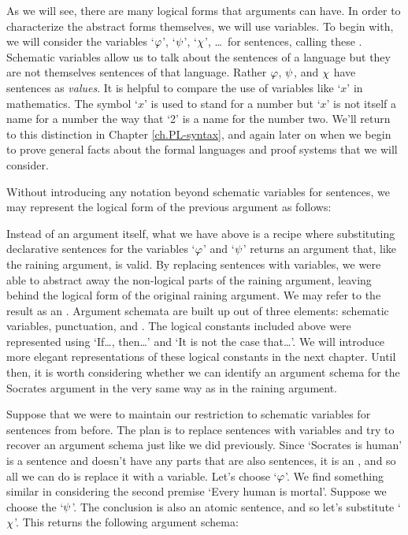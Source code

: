 As we will see, there are many logical forms that arguments can have.
In order to characterize the abstract forms themselves, we will use variables.
To begin with, we will consider the variables `$\varphi$', `$\psi$', `$\chi$', \ldots\ for sentences, calling these .
Schematic variables allow us to talk about the sentences of a language but they are not themselves sentences of that language.
Rather $\varphi$, $\psi$, and $\chi$ have sentences as \textit{values}.
It is helpful to compare the use of variables like `$x$' in mathematics.
The symbol `$x$' is used to stand for a number but `$x$' is not itself a name for a number the way that `2' is a name for the number two.
We'll return to this distinction in Chapter \ref{ch.PL-syntax}, and again later on when we begin to prove general facts about the formal languages and proof systems that we will consider.

Without introducing any notation beyond schematic variables for sentences, we may represent the logical form of the previous argument as follows:

\begin{earg}
\end{earg}

Instead of an argument itself, what we have above is a recipe where substituting declarative sentences for the variables `$\varphi$' and `$\psi$' returns an argument that, like the raining argument, is valid.
By replacing sentences with variables, we were able to abstract away the non-logical parts of the raining argument, leaving behind the logical form of the original raining argument.
We may refer to the result as an .
Argument schemata are built up out of three elements: schematic variables, punctuation, and .
The logical constants included above were represented using `If\ldots, then\ldots' and `It is not the case that\ldots'.
We will introduce more elegant representations of these logical constants in the next chapter.
Until then, it is worth considering whether we can identify an argument schema for the Socrates argument in the very same way as in the raining argument.

Suppose that we were to maintain our restriction to schematic variables for sentences from before.
The plan is to replace sentences with variables and try to recover an argument schema just like we did previously.
Since `Socrates is human' is a sentence and doesn't have any parts that are also sentences, it is an , and so all we can do is replace it with a variable.
Let's choose `$\varphi$'. 
We find something similar in considering the second premise `Every human is mortal'.
Suppose we choose the `$\psi$'.
The conclusion is also an atomic sentence, and so let's substitute `$\chi$'.
This returns the following argument schema:

